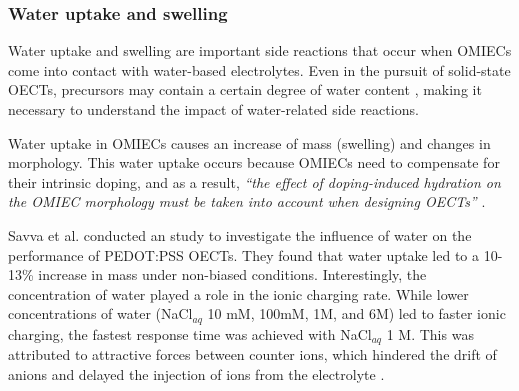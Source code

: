

\subsubsection{Water uptake and swelling}

Water uptake and swelling are important side reactions that occur when OMIECs come into contact with water-based electrolytes. Even in the pursuit of solid-state OECTs, precursors may contain a certain degree of water content  \cite{weissbachPhotopatternableSolidElectrolyte2022}\cite{nguyen-dangBiomaterialBasedSolidElectrolyteOrganic2021}, making it necessary to understand the impact of water-related side reactions. %

Water uptake in OMIECs causes an increase of mass (swelling) and changes in morphology. This water uptake occurs because OMIECs need to compensate for their intrinsic doping, and as a result, \textit{``the effect of doping-induced hydration on the OMIEC morphology must be taken into account when designing OECTs''} \cite{savvaBalancingIonicElectronic2020}.

Savva et al. conducted an study to investigate the influence of water on the performance of PEDOT:PSS OECTs. They found that water uptake %
led to a 10-13\% increase in mass under non-biased conditions. Interestingly, the concentration of water played a role in the ionic charging rate. While lower concentrations of water (NaCl$_{aq}$ 10 mM, 100mM, 1M, and 6M) led to faster ionic charging, %
the fastest %
response time was achieved with NaCl$_{aq}$ 1 M. This was attributed to attractive forces between counter ions, which %
hindered the drift of anions and delayed the injection of ions from the electrolyte %
\cite{savvaInfluenceWaterPerformance2019}.

